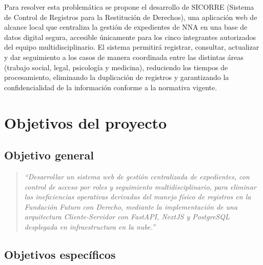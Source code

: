 Para resolver esta problemática se propone el desarrollo de SICORRE (Sistema de Control 
de Registros para la Restitución de Derechos), una aplicación web de alcance local que 
centraliza la gestión de expedientes de NNA en una base de datos digital segura, accesible 
únicamente para los cinco integrantes autorizados del equipo multidisciplinario. El sistema 
permitirá registrar, consultar, actualizar y dar seguimiento a los casos de manera 
coordinada entre las distintas áreas (trabajo social, legal, psicología y medicina), 
reduciendo los tiempos de procesamiento, eliminando la duplicación de registros y 
garantizando la confidencialidad de la información conforme a la normativa vigente.

\section{Objetivos del proyecto}

\subsection{Objetivo general}

\begin{quotation}
	{\em ``Desarrollar un sistema web de gestión centralizada de expedientes, con control 
		de acceso por roles y seguimiento multidisciplinario, para eliminar las ineficiencias 
		operativas derivadas del manejo físico de registros en la Fundación Futuro con Derecho, 
		mediante la implementación de una arquitectura Cliente-Servidor con FastAPI, NextJS 
		y PostgreSQL desplegada en infraestructura en la nube.''}
\end{quotation}

\subsection{Objetivos específicos}

